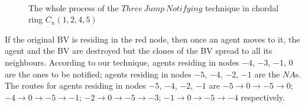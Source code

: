 \begin{figure} [H]
  \centering 
  \hspace{1in} 
   \
  \hspace{1in} 
  \hspace{1in} 
  \caption{The whole process of the $Three\,Jump\,Notifying$ technique in chordal ring $C_n(1, 2, 4, 5)$} 
  \label{fig:subfig} %
\end{figure}


If the original BV is residing in the red node, then once an agent moves to it, the agent and the BV are destroyed but the clones of the BV spread to all its neighbours. According to our technique, 
agents residing in nodes $-4$, $-3$, $-1$, $0$ are the  ones to be notified; 
agents residing in nodes $-5$, $-4$, $-2$, $-1$ are the $NA$s.
 The routes for agents residing in nodes $-5$, $-4$, $-2$, $-1$ are $-5{\rightarrow}0{\rightarrow}-5{\rightarrow}0$; $-4{\rightarrow}0{\rightarrow}-5{\rightarrow}-1$; $-2{\rightarrow}0{\rightarrow}-5{\rightarrow}-3$; $-1{\rightarrow}0{\rightarrow}-5{\rightarrow}-4$ respectively.\\

